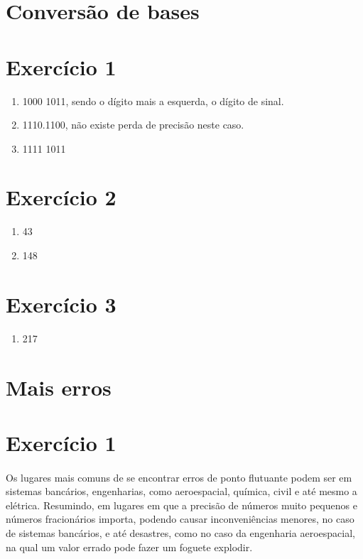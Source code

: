\documentclass{article}
\begin{document}
\section{Conversão de bases}

\section*{Exercício 1}

\begin{enumerate}[label=(\alph*)]
    \item 1000 1011, sendo o dígito mais a esquerda, o dígito de sinal.
    \item 1110.1100, não existe perda de precisão neste caso.
    \item 1111 1011
\end{enumerate}

\section*{Exercício 2}

\begin{enumerate}[label=(\alph*)]
    \item 43
    \item 148
\end{enumerate}

\section*{Exercício 3}

\begin{enumerate}[label=(\alph*)]
    \item 217
\end{enumerate}

\section{Mais erros}
\section*{Exercício 1}
\paragraph{}Os lugares mais comuns de se encontrar erros de ponto flutuante podem ser em sistemas bancários, engenharias, como aeroespacial, química, civil e até mesmo a elétrica. Resumindo, em lugares em que a precisão de números muito pequenos e números fracionários importa, podendo causar inconveniências menores, no caso de sistemas bancários, e até desastres, como no caso da engenharia aeroespacial, na qual um valor errado pode fazer um foguete explodir.
\end{document}
